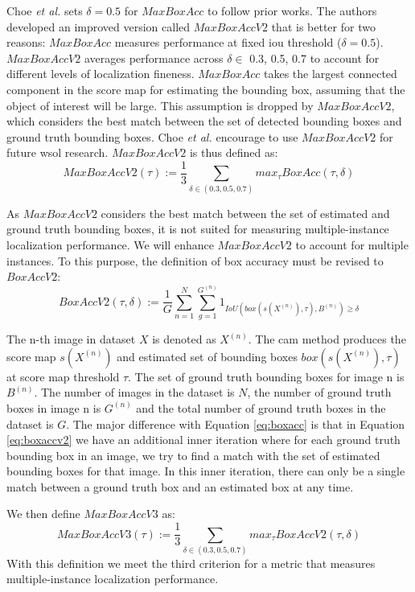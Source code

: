 Choe \textit{et al.} \cite{choe2020evaluating} sets $\delta = 0.5$ for $MaxBoxAcc$ to follow prior works. The authors developed an improved version called $MaxBoxAccV2$ that is better for two reasons: $MaxBoxAcc$ measures performance at fixed \acrshort{iou} threshold ($\delta = 0.5$). $MaxBoxAccV2$ averages performance across $\delta \in$ {0.3, 0.5, 0.7} to account for different levels of localization fineness. $MaxBoxAcc$ takes the largest connected component in the score map for estimating the bounding box, assuming that the object of interest will be large. This assumption is dropped by $MaxBoxAccV2$, which considers the best match between the set of detected bounding boxes and ground truth bounding boxes. Choe \textit{et al.} encourage to use $MaxBoxAccV2$ for future \acrshort{wsol} research. $MaxBoxAccV2$ is thus defined as:
\begin{equation} \label{eq:maxboxaccv2}
    MaxBoxAccV2(\tau) := \frac{1}{3} \sum_{\delta \in (0.3,0.5,0.7)} max_{\tau} BoxAcc(\tau,\delta)
\end{equation}

As $MaxBoxAccV2$ considers the best match between the set of estimated and ground truth bounding boxes, it is not suited for measuring multiple-instance localization performance. We will enhance $MaxBoxAccV2$ to account for multiple instances. To this purpose, the definition of box accuracy must be revised to $BoxAccV2$:
\begin{equation} \label{eq:boxaccv2}
    BoxAccV2(\tau,\delta) := \frac{1}{G} \sum^{N}_{n=1} \sum^{G^{(n)}}_{g=1}  1_{IoU(box(s(X^{(n)}),\tau),B^{(n)})\ge\delta}
\end{equation}

The n-th image in dataset $X$ is denoted as $X^{(n)}$. The \acrshort{cam} method produces the score map $s(X^{(n)})$ and estimated set of bounding boxes $box(s(X^{(n)}),\tau)$ at score map threshold $\tau$. The set of ground truth bounding boxes for image n is $B^{(n)}$. The number of images in the dataset is $N$, the number of ground truth boxes in image n is $G^{(n)}$ and the total number of ground truth boxes in the dataset is $G$. The major difference with Equation \ref{eq:boxacc} is that in Equation \ref{eq:boxaccv2} we have an additional inner iteration where for each ground truth bounding box in an image, we try to find a match with the set of estimated bounding boxes for that image. In this inner iteration, there can only be a single match between a ground truth box and an estimated box at any time.

We then define $MaxBoxAccV3$ as:
\begin{equation} \label{eq:maxboxaccv3}
    MaxBoxAccV3(\tau) := \frac{1}{3} \sum_{\delta \in (0.3,0.5,0.7)} max_{\tau} BoxAccV2(\tau,\delta)
\end{equation}
With this definition we meet the third criterion for a metric that measures multiple-instance localization performance.


